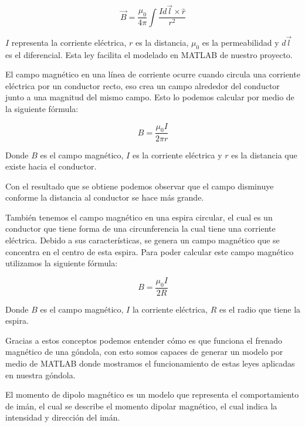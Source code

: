 \begin{equation}
    \vec{B} = \frac{\mu_0}{4\pi} \int \frac{I d\vec{l} \times \hat{r}}{r^2}
\end{equation}

$I$ representa la corriente eléctrica, $r$ es la distancia, $\mu_0$ es la permeabilidad y $d\vec{l}$ es el diferencial. Esta ley facilita el modelado en MATLAB de nuestro proyecto.


\tab El campo magnético en una línea de corriente ocurre cuando circula una corriente eléctrica por un conductor recto, eso crea un campo alrededor del conductor junto a una magnitud del mismo campo. Esto lo podemos calcular por medio de la siguiente fórmula:

\begin{equation}
    B = \frac{\mu_0 I}{2\pi r}
\end{equation}

Donde $B$ es el campo magnético, $I$ es la corriente eléctrica y $r$ es la distancia que existe hacia el conductor.

Con el resultado que se obtiene podemos observar que el campo disminuye conforme la distancia al conductor se hace más grande.


\tab También tenemos el campo magnético en una espira circular, el cual es un conductor que tiene forma de una circunferencia la cual tiene una corriente eléctrica. Debido a sus características, se genera un campo magnético que se concentra en el centro de esta espira.
Para poder calcular este campo magnético utilizamos la siguiente fórmula:

\begin{equation}
    B = \frac{\mu_0 I}{2R}
\end{equation}

Donde $B$ es el campo magnético, $I$ la corriente eléctrica, $R$ es el radio que tiene la espira.


\tab Gracias a estos conceptos podemos entender cómo es que funciona el frenado magnético de una góndola, con esto somos capaces de generar un modelo por medio de MATLAB donde mostramos el funcionamiento de estas leyes aplicadas en nuestra góndola.


\tab El momento de dipolo magnético es un modelo que representa el comportamiento de imán, el cual se describe el momento dipolar magnético, el cual indica la intensidad y dirección del imán.

